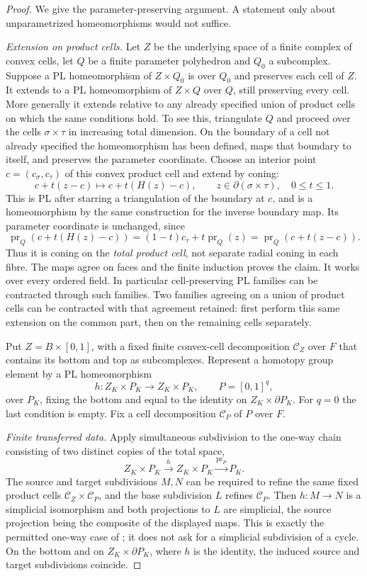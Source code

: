 \documentclass[11pt,a4paper]{article}
\theoremstyle{definition}
\begin{document}
\begin{proof}
We give the parameter-preserving argument. A statement only about
unparametrized homeomorphisms would not suffice.

\emph{Extension on product cells.}
Let $Z$ be the underlying space of a finite complex of convex
cells, let $Q$ be a finite parameter polyhedron and $Q_0$ a
subcomplex. Suppose a PL homeomorphism of $Z\times Q_0$ is over
$Q_0$ and preserves each cell of $Z$. It extends to a PL
homeomorphism of $Z\times Q$ over $Q$, still preserving every
cell. More generally it extends relative to any already
specified union of product cells on which the same conditions hold.
To see this, triangulate $Q$ and proceed over the cells
$\sigma\times\tau$ in increasing total dimension. On the boundary
of a cell not already specified the homeomorphism has been
defined, maps that boundary to itself, and preserves the parameter
coordinate. Choose an interior point
$c=(c_\sigma,c_\tau)$ of this convex product cell and extend
by coning:
\[
 c+t(z-c)\longmapsto c+t(H(z)-c),
 \qquad z\in\partial(\sigma\times\tau),\quad 0\le t\le1.
\]
This is PL after starring a triangulation of the boundary at
$c$, and is a homeomorphism by the same construction for the
inverse boundary map. Its parameter coordinate is unchanged,
since
\[
 \operatorname{pr}_Q(c+t(H(z)-c))
 =(1-t)c_\tau+t\operatorname{pr}_Q(z)
 =\operatorname{pr}_Q(c+t(z-c)).
\]
Thus it is coning on the \emph{total product cell}, not separate
radial coning in each fibre. The maps agree on faces and the
finite induction proves the claim. It works over every ordered
field. In particular cell-preserving PL families can be contracted
through such families. Two families agreeing on a union of
product cells can be contracted with that agreement retained:
first perform this same extension on the common part, then on
the remaining cells separately.

Put $Z=B\times[0,1]$, with a fixed finite convex-cell
decomposition $\mathcal C_Z$ over $F$ that contains its bottom
and top as subcomplexes. Represent a homotopy group element by
a PL homeomorphism
\[
 h:Z_K\times P_K\longrightarrow Z_K\times P_K,
 \qquad P=[0,1]^q,
\]
over $P_K$, fixing the bottom and equal to the identity on
$Z_K\times\partial P_K$. For $q=0$ the last condition is empty.
Fix a cell decomposition $\mathcal C_P$ of $P$ over $F$.

\emph{Finite transferred data.}
Apply simultaneous subdivision to the one-way chain consisting
of two distinct copies of the total space,
\[
 Z_K\times P_K\xrightarrow{h}Z_K\times P_K
          \xrightarrow{\operatorname{pr}_P}P_K.
\]
The source and target subdivisions $M,N$ can be required to
refine the same fixed product cells
$\mathcal C_Z\times\mathcal C_P$, and the base subdivision $L$
refines $\mathcal C_P$. Then $h:M\to N$ is a simplicial
isomorphism and both projections to $L$ are simplicial, the
source projection being the composite of the displayed maps.
This is exactly the permitted one-way case of
\cite[Theorems 2.14--2.15, pp.~17--19]{RourkeSanderson1972};
it does not ask for a simplicial subdivision of a cycle.
On the bottom and on $Z_K\times\partial P_K$, where $h$ is
the identity, the induced source and target subdivisions coincide.


\end{proof}
\end{document}
